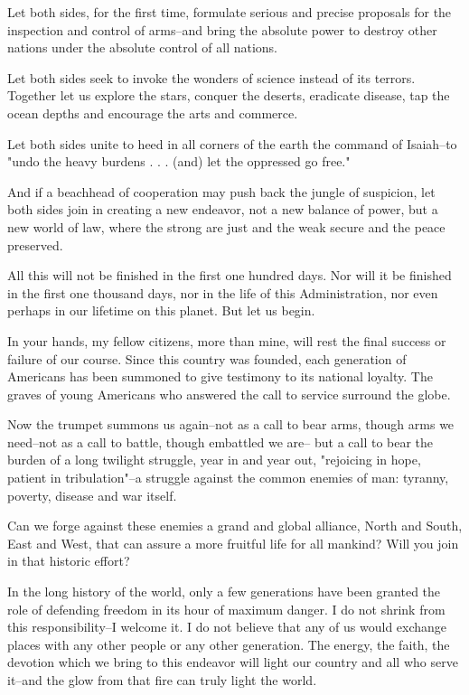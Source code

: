\documentclass[10pt,a4paper]{article}
\begin{document}
Let both sides, for the first time, formulate serious and precise proposals for the inspection and control of arms--and bring the absolute power to destroy other nations under the absolute control of all nations.

Let both sides seek to invoke the wonders of science instead of its terrors. Together let us explore the stars, conquer the deserts, eradicate disease, tap the ocean depths and encourage the arts and commerce.

Let both sides unite to heed in all corners of the earth the command of Isaiah--to "undo the heavy burdens . . . (and) let the oppressed go free."

And if a beachhead of cooperation may push back the jungle of suspicion, let both sides join in creating a new endeavor, not a new balance of power, but a new world of law, where the strong are just and the weak secure and the peace preserved.

All this will not be finished in the first one hundred days. Nor will it be finished in the first one thousand days, nor in the life of this Administration, nor even perhaps in our lifetime on this planet. But let us begin.

In your hands, my fellow citizens, more than mine, will rest the final success or failure of our course. Since this country was founded, each generation of Americans has been summoned to give testimony to its national loyalty. The graves of young Americans who answered the call to service surround the globe.

Now the trumpet summons us again--not as a call to bear arms, though arms we need--not as a call to battle, though embattled we are-- but a call to bear the burden of a long twilight struggle, year in and year out, "rejoicing in hope, patient in tribulation"--a struggle against the common enemies of man: tyranny, poverty, disease and war itself.

Can we forge against these enemies a grand and global alliance, North and South, East and West, that can assure a more fruitful life for all mankind? Will you join in that historic effort?

In the long history of the world, only a few generations have been granted the role of defending freedom in its hour of maximum danger. I do not shrink from this responsibility--I welcome it. I do not believe that any of us would exchange places with any other people or any other generation. The energy, the faith, the devotion which we bring to this endeavor will light our country and all who serve it--and the glow from that fire can truly light the world.
\end{document}
